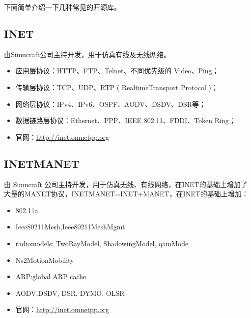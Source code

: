 下面简单介绍一下几种常见的开源库。

\subsection{INET}
\label{inet}

由Simucraft公司主持开发，用于仿真有线及无线网络。

\begin{itemize}
\item 应用层协议：HTTP、FTP、Telnet、不同优先级的 Video、Ping；

\item 传输层协议：TCP、UDP、RTP ( RealtimeTransport Protocol )；

\item 网络层协议：IPv4、IPv6、OSPF、AODV、DSDV、DSR等；

\item 数据链路层协议：Ethernet、PPP、IEEE 802.11、FDDI、Token Ring；

\item 官网：\href{http://inet.omnetpp.org}{http:\slash \slash inet.omnetpp.org}

\end{itemize}

\subsection{INETMANET}
\label{inetmanet}

由 Simucraft 公司主持开发，用于仿真无线、有线网络，在INET的基础上增加了大量的MANET协议，INETMANET=INET+MANET，在INET的基础上增加：

\begin{itemize}
\item 802.11a

\item Ieee80211Mesh,Ieee80211MeshMgmt

\item radiomodels: TwoRayModel, ShadowingModel, qamMode

\item Ns2MotionMobility

\item ARP:global ARP cache

\item AODV,DSDV, DSR, DYMO, OLSR

\item 官网：\href{http://inet.omnetpp.org}{http:\slash \slash inet.omnetpp.org}

\end{itemize}

